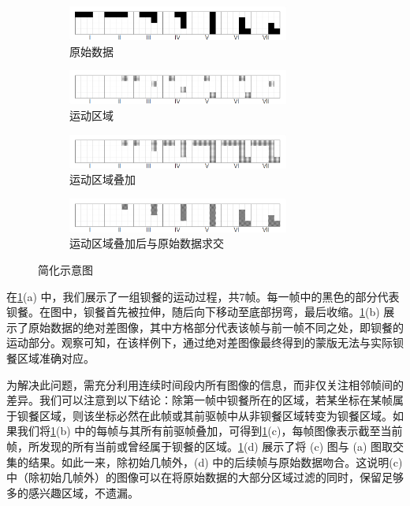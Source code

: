 \begin{figure}[!htp]
    \centering
    \begin{subfigure}{\textwidth}
        \centering
        \includegraphics[width=0.8\textwidth]{figures/4_示例_1.png}
        \caption{原始数据}
    \end{subfigure}
    \begin{subfigure}{\textwidth}
        \centering
        \includegraphics[width=0.8\textwidth]{figures/4_示例_2.png}
        \caption{运动区域}
    \end{subfigure}
    \begin{subfigure}{\textwidth}
        \centering
        \includegraphics[width=0.8\textwidth]{figures/4_示例_3.png}
        \caption{运动区域叠加}
    \end{subfigure}
    \begin{subfigure}{\textwidth}
        \centering
        \includegraphics[width=0.8\textwidth]{figures/4_示例_4.png}
        \caption{运动区域叠加后与原始数据求交}
    \end{subfigure}
    \caption{简化示意图}
    \label{fig:4_示意图}
\end{figure}

在\cref{fig:4_示意图}(a) 中，我们展示了一组钡餐的运动过程，共7帧。每一帧中的黑色的部分代表钡餐。在图中，钡餐首先被拉伸，随后向下移动至底部拐弯，最后收缩。\cref{fig:4_示意图}(b) 展示了原始数据的绝对差图像，其中方格部分代表该帧与前一帧不同之处，即钡餐的运动部分。观察可知，在该样例下，通过绝对差图像最终得到的蒙版无法与实际钡餐区域准确对应。

为解决此问题，需充分利用连续时间段内所有图像的信息，而非仅关注相邻帧间的差异。我们可以注意到以下结论：除第一帧中钡餐所在的区域，若某坐标在某帧属于钡餐区域，则该坐标必然在此帧或其前驱帧中从非钡餐区域转变为钡餐区域。如果我们将\cref{fig:4_示意图}(b) 中的每帧与其所有前驱帧叠加，可得到\cref{fig:4_示意图}(c)，每帧图像表示截至当前帧，所发现的所有当前或曾经属于钡餐的区域。\cref{fig:4_示意图}(d) 展示了将 (c) 图与 (a) 图取交集的结果。如此一来，除初始几帧外，(d) 中的后续帧与原始数据吻合。这说明(c) 中（除初始几帧外）的图像可以在将原始数据的大部分区域过滤的同时，保留足够多的感兴趣区域，不遗漏。

